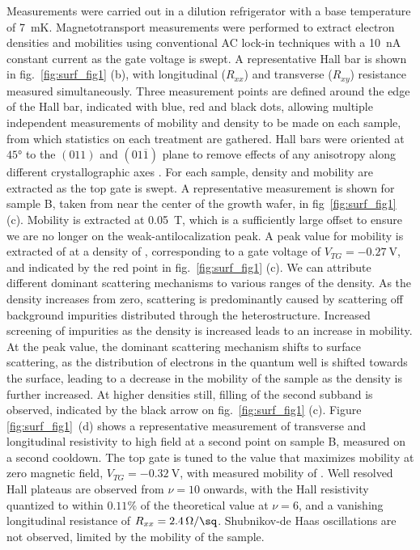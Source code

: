 Measurements were carried out in a dilution refrigerator with a base temperature of \SI{7}{\milli\kelvin}. Magnetotransport measurements were performed to extract electron densities and mobilities using conventional AC lock-in techniques with a \SI{10}{\nano\ampere} constant current as the gate voltage is swept. A representative Hall bar is shown in fig.~\ref{fig:surf_fig1} (b), with longitudinal ($R_{xx}$) and transverse ($R_{xy}$) resistance measured simultaneously. Three measurement points are defined around the edge of the Hall bar, indicated with blue, red and black dots, allowing multiple independent measurements of mobility and density to be made on each sample, from which statistics on each treatment are gathered. Hall bars were oriented at $\ang{45}$ to the $(011)$ and $(01\overline{1})$ plane to remove effects of any anisotropy along different crystallographic axes \cite{PhysRevB.67.045309,PhysRevB.77.235307}. For each sample, density and mobility are extracted as the top gate is swept. A representative measurement is shown for sample B, taken from near the center of the growth wafer, in fig~\ref{fig:surf_fig1} (c). Mobility is extracted at \SI{0.05}{\tesla}, which is a sufficiently large offset to ensure we are no longer on the weak-antilocalization peak. A peak value for mobility is extracted of  at a density of , corresponding to a gate voltage of $V_{TG} = \SI{-0.27}{\volt}$, and indicated by the red point in fig.~\ref{fig:surf_fig1} (c). We can attribute different dominant scattering mechanisms to various ranges of the density\cite{Matsumoto_1974,PhysRevB.32.8126,PhysRevB.16.4446}. As the density increases from zero, scattering is predominantly caused by scattering off background impurities distributed through the heterostructure\cite{scattering}. Increased screening of impurities as the density is increased leads to an increase in mobility. At the peak value, the dominant scattering mechanism shifts to surface scattering, as the distribution of electrons in the quantum well is shifted towards the surface\cite{doi:10.1063/1.119829,PhysRevB.93.235312}, leading to a decrease in the mobility of the sample as the density is further increased. At higher densities still, filling of the second subband is observed, indicated by the black arrow on fig.~\ref{fig:surf_fig1} (c). Figure \ref{fig:surf_fig1}~(d) shows a representative measurement of transverse and longitudinal resistivity to high field at a second point on sample B, measured on a second cooldown. The top gate is tuned to the value that maximizes mobility at zero magnetic field, $V_{TG} = \SI{-0.32}{\volt}$, with measured mobility of . Well resolved Hall plateaus are observed from $\nu = 10$ onwards, with the Hall resistivity quantized to within $0.11\%$ of the theoretical value at $\nu = 6$, and a vanishing longitudinal resistance of $R_{xx} = \SI[per-mode=symbol]{2.4}{\ohm\per\sq}$. Shubnikov-de Haas oscillations are not observed, limited by the mobility of the sample.


